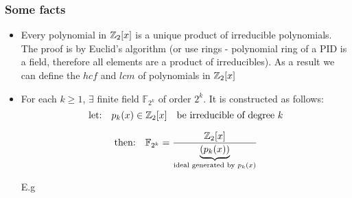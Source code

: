 \documentclass[]{article}
\theoremstyle{definition}
\theoremstyle{remark}
\numberwithin{equation}{section}
\begin{document}
			\subsubsection*{Some facts}
				\begin{itemize}
					\item Every polynomial in $\mathbb{Z}_2[x]$ is a unique product of irreducible polynomials. The proof is by Euclid's algorithm (or use rings - polynomial ring of a PID is a field, therefore all elements are a product of irreducibles). As a result we can define the $hcf$ and $lcm$ of polynomials in $\mathbb{Z}_2[x]$
					\item For each $k \geq 1$, $\exists$ finite field $\mathbb{F}_{2^k}$ of order $2^k$. It is constructed as follows:
					\[
						\text{let:} \quad p_k(x) \in \mathbb{Z}_2[x] \quad \text{be irreducible of degree $k$}
					\]

					\[
						\text{then:} \quad \mathbb{F}_{2^k} = \frac{\mathbb{Z}_2[x]}{\underbrace{(p_k(x))}_\text{ideal generated by $p_k(x)$}}
					\]

					E.g\\


\end{itemize}
\end{document}
